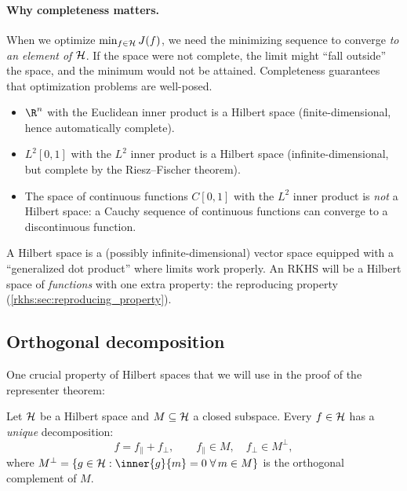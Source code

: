 \begin{notechapter}
\paragraph{Why completeness matters.} When we optimize $\min_{f \in \mathcal{H}}
J(f)$, we need the minimizing sequence to converge \emph{to an element
of $\mathcal{H}$}. If the space were not complete, the limit might ``fall
outside'' the space, and the minimum would not be attained. Completeness
guarantees that optimization problems are well-posed.

\begin{example}
\begin{itemize}
  \item $\R^n$ with the Euclidean inner product is a Hilbert space
  (finite-dimensional, hence automatically complete).
  \item $L^2[0,1]$ with the $L^2$ inner product is a Hilbert space
  (infinite-dimensional, but complete by the Riesz--Fischer theorem).
  \item The space of continuous functions $C[0,1]$ with the $L^2$ inner
  product is \emph{not} a Hilbert space: a Cauchy sequence of continuous
  functions can converge to a discontinuous function.
\end{itemize}
\end{example}

\begin{keyidea}
A Hilbert space is a (possibly infinite-dimensional) vector space
equipped with a ``generalized dot product'' where limits work properly.
An RKHS will be a Hilbert space of \emph{functions} with one extra
property: the reproducing property
(\cref{rkhs:sec:reproducing_property}).
\end{keyidea}

\subsection{Orthogonal decomposition}
\label{rkhs:subsec:orthogonal}

One crucial property of Hilbert spaces that we will use in the proof of
the representer theorem:

\begin{theorem}
\label{rkhs:thm:ortho_decomp}
Let $\mathcal{H}$ be a Hilbert space and $M \subseteq \mathcal{H}$ a closed
subspace. Every $f \in \mathcal{H}$ has a \emph{unique} decomposition:
\[
f = f_\parallel + f_\perp, \qquad f_\parallel \in M,\quad f_\perp \in M^\perp,
\]
where $M^\perp = \{g \in \hilb : \inner{g}{m} = 0 \;\forall\, m \in M\}$
is the orthogonal complement of $M$.


\end{theorem}
\end{notechapter}

